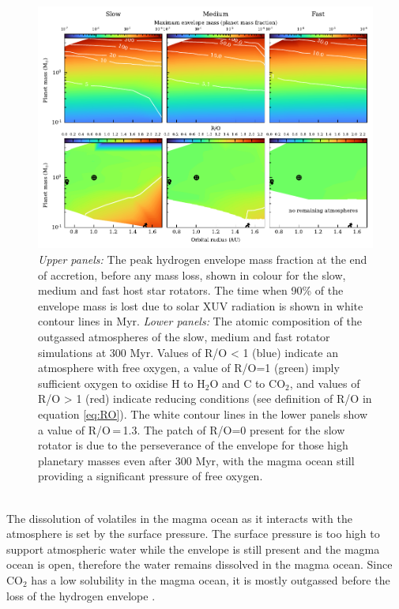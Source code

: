 \documentclass[bibyear,tradiabstract]{aa}
\begin{document}
\begin{figure}
\centering
\includegraphics[width=18cm]{6contourfig_log.pdf}
   \caption{\textit{Upper panels:} The peak hydrogen envelope mass fraction at the end of accretion, before any mass loss, shown in colour for the slow, medium and fast host star rotators. The time when 90\% of the envelope mass is lost due to solar XUV radiation is shown in white contour lines in Myr. \textit{Lower panels:} The atomic composition of the outgassed atmospheres of the slow, medium and fast rotator simulations at 300 Myr. Values of R/O < 1 (blue) indicate an atmosphere with free oxygen, a value of R/O=1 (green) imply sufficient oxygen to oxidise H to H$_2$O and C to CO$_2$, and values of R/O > 1 (red) indicate reducing conditions {(see definition of R/O in equation \ref{eq:RO})}. The white contour lines in the lower panels show a value of R/O\,=\,1.3. The patch of R/O=0 present for the slow rotator is due to the perseverance of the envelope for those high planetary masses even after 300 Myr, with the magma ocean still providing a significant pressure of free oxygen.
           }
      \label{Fig:Menv_molecules}
\end{figure}
\\
{The dissolution of volatiles in the magma ocean as it interacts with the atmosphere is set by the surface pressure. The surface pressure is too high to support atmospheric water while the envelope is still present and the magma ocean is open, therefore the water remains dissolved in the magma ocean. Since CO$_2$ has a low solubility in the magma ocean, it is mostly outgassed before the loss of the hydrogen envelope \citep{Johansen+2023III}. }\\
\end{document}
